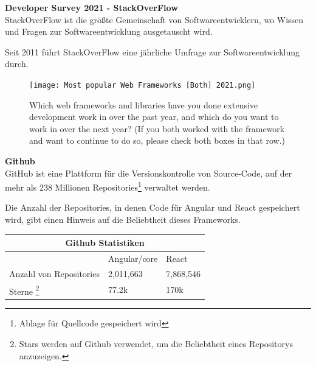 \begin{flushleft}
  \textbf{Developer Survey 2021 - StackOverFlow}\\
  StackOverFlow ist die größte Gemeinschaft von Softwareentwicklern, wo Wissen und Fragen zur Softwareentwicklung ausgetauscht wird.

  Seit 2011 führt StackOverFlow eine jährliche Umfrage zur Softwareentwicklung durch.

  \begin{figure}[h]
    \centering
    \texttt{[image: Most popular Web Frameworks [Both] 2021.png]}
    \caption{ Which web frameworks and libraries have you done extensive development work in over the past year, and which do you want to work in over the next year? (If you both worked with the framework and want to continue to do so, please check both boxes in that row.) {\cite{SO01}}}

  \end{figure}
\end{flushleft}

\newpage

\begin{flushleft}
  \textbf{Github}\\
  GitHub ist eine Plattform für die Versionskontrolle von Source-Code, auf der mehr als 238 Millionen Repositories\footnote{Ablage für Quellcode gespeichert wird} verwaltet werden{\cite{GH07}}.
\end{flushleft}

Die Anzahl der Repositories, in denen Code für Angular und React gespeichert wird, gibt einen Hinweis auf die Beliebtheit dieses Frameworks.
\\
\begin{table}[h!]
  \centering
  \begin{tabular}{ |p{5cm}||p{3.6cm}|p{3.6cm}|  }
    \hline
    \multicolumn{3}{|c|}{Github Statistiken}                                                                                                  \\
    \hline
                                                                                                                   & Angular/core & React     \\
    \hline
    Anzahl von     Repositories                                                                                    & 2,011,663    & 7,868,546
    \\

    \hline
    Sterne \footnote{Stars werden auf Github verwendet, um die Beliebtheit eines Repositorys anzuzeigen.} & 77.2k        & 170k
    \\
    \hline
  \end{tabular}
\end{table}

